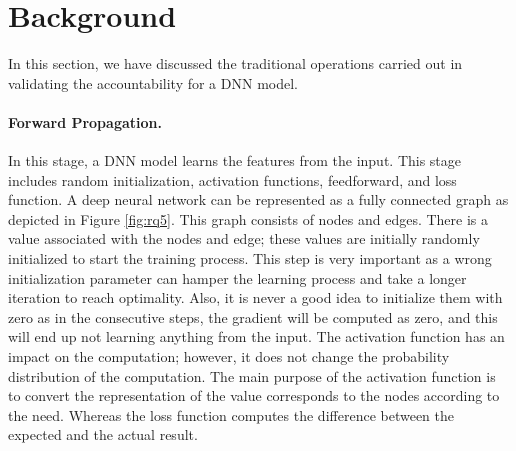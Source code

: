 \section{Background}
\label{sec:background}
In this section, we have discussed the traditional operations carried out in validating the accountability for a DNN model.
\paragraph{Forward Propagation.}  In this stage, a DNN model learns the features from the input. This stage includes random initialization, activation functions, feedforward, and loss function. A deep neural network can be represented as a fully connected graph as depicted in Figure \ref{fig:rq5}. This graph consists of nodes and edges. There is a value associated with the nodes and edge; these values are initially randomly initialized to start the training process. This step is very important as a wrong initialization parameter can hamper the learning process and take a longer iteration to reach optimality. Also, it is never a good idea to initialize them with zero as in the consecutive steps, the gradient will be computed as zero, and this will end up not learning anything from the input. The activation function has an impact on the computation; however, it does not change the probability distribution of the computation. The main purpose of the activation function is to convert the representation of the value corresponds to the nodes according to the need. Whereas the loss function computes the difference between the expected and the actual result.
